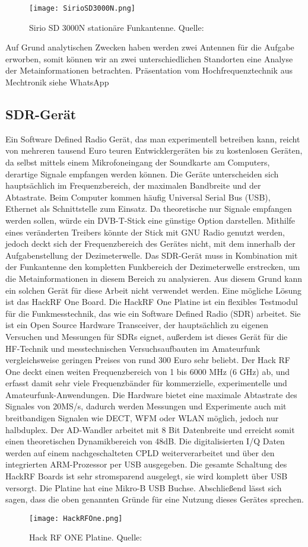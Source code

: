 \begin{figure}[H]
	\centering
	\texttt{[image: SirioSD3000N.png]}
	\caption[Sirio SD 3000N stationäre Funkantenne]{Sirio SD 3000N stationäre Funkantenne. Quelle: \cite{Funktechnik:2018}} 
	\label{Sirio SD 3000N Antenne}
\end{figure}

Auf Grund analytischen Zwecken haben werden zwei Antennen für die Aufgabe erworben, somit können wir an zwei unterschiedlichen Standorten eine Analyse der Metainformationen betrachten.
Präsentation vom Hochfrequenztechnik aus Mechtronik siehe WhatsApp

\subsection{SDR-Gerät}
Ein Software Defined Radio Gerät, das man experimentell betreiben kann, reicht von mehreren tausend Euro teuren Entwicklergeräten bis zu kostenlosen Geräten, da selbst mittels einem Mikrofoneingang der Soundkarte am Computers, derartige Signale empfangen werden können. Die Geräte unterscheiden sich hauptsächlich im Frequenzbereich, der maximalen Bandbreite und der Abtastrate. Beim Computer kommen häufig Universal Serial Bus (USB), Ethernet als Schnittstelle zum  Einsatz.
Da theoretische nur Signale empfangen werden sollen, würde ein DVB-T-Stick eine günstige Option darstellen. Mithilfe eines veränderten Treibers könnte der Stick mit GNU Radio genutzt werden, jedoch deckt sich der Frequenzbereich des Gerätes nicht, mit dem innerhalb der Aufgabenstellung der Dezimeterwelle.
Das SDR-Gerät muss in Kombination mit der Funkantenne den kompletten Funkbereich der Dezimeterwelle erstrecken, um die Metainformationen in diesem Bereich zu analysieren. Aus diesem Grund kann ein solchen Gerät für diese Arbeit nicht verwendet werden.
Eine mögliche Lösung ist das HackRF One Board. Die HackRF One Platine ist ein flexibles Testmodul für die Funkmesstechnik, das wie ein Software Defined Radio (SDR) arbeitet. Sie ist ein Open Source Hardware Transceiver, der hauptsächlich zu eigenen Versuchen und Messungen für SDRs eignet, außerdem ist dieses Gerät für die HF-Technik und messtechnischen Versuchsaufbauten im Amateurfunk vergleichsweise geringen Preises von rund 300 Euro sehr beliebt.
Der Hack RF One deckt einen weiten Frequenzbereich von 1 bis 6000 MHz (6 GHz) ab, und erfasst damit sehr viele Frequenzbänder für kommerzielle, experimentelle und Amateurfunk-Anwendungen. Die Hardware bietet eine maximale Abtastrate des Signales von 20MS/s, dadurch werden Messungen und Experimente auch mit breitbandigen Signalen wie DECT, WFM oder WLAN möglich, jedoch nur halbduplex. Der AD-Wandler arbeitet mit 8 Bit Datenbreite und erreicht somit einen theoretischen Dynamikbereich von 48dB. Die digitalisierten I/Q Daten werden auf einem nachgeschalteten CPLD weiterverarbeitet und über den integrierten ARM-Prozessor per USB ausgegeben. Die gesamte Schaltung des HackRF Boards ist sehr stromsparend ausgelegt, sie wird komplett über USB versorgt. Die Platine hat eine Mikro-B USB Buchse. Abschließend lässt sich sagen, dass die oben genannten Gründe für eine Nutzung dieses Gerätes sprechen.\cite{wimo:2018}
\begin{figure}[H]
	\centering
	\texttt{[image: HackRFOne.png]}
	\caption[Hack RF ONE Platine]{Hack RF ONE Platine. Quelle: \cite{HackRFOne:2018}} 
	\label{HackRFOne}
\end{figure}
